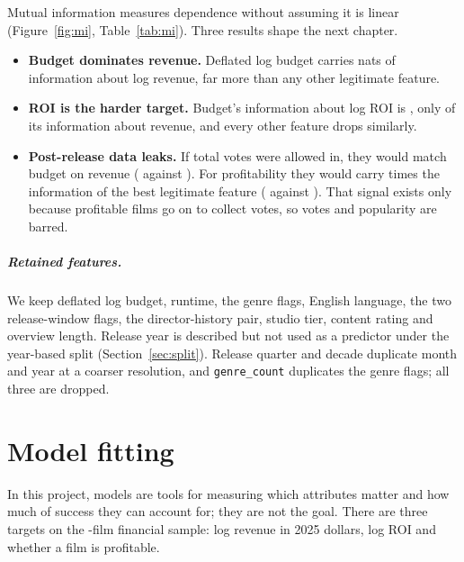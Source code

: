\documentclass[a4paper,12pt]{report}
\newcommand{\code}[1]{\texttt{#1}}
\begin{document}
Mutual information measures dependence without assuming it is linear (Figure~\ref{fig:mi}, Table~\ref{tab:mi}). Three results shape the next chapter.

\begin{itemize}
  \item \textbf{Budget dominates revenue.} Deflated log budget carries \FeatMiBudgetRevenue{} nats of information about log revenue, far more than any other legitimate feature.
  \item \textbf{ROI is the harder target.} Budget's information about log ROI is \FeatMiBudgetRoi, only \FeatMiRoiToRevenueRatioBudget{} of its information about revenue, and every other feature drops similarly.
  \item \textbf{Post-release data leaks.} If total votes were allowed in, they would match budget on revenue (\FeatMiVotesRevenueLeaky{} against \FeatMiBudgetRevenue). For profitability they would carry \FeatMiLeakRatioProfitable{} times the information of the best legitimate feature (\FeatMiVotesProfitableLeaky{} against \FeatMiBestLegitProfitable). That signal exists only because profitable films go on to collect votes, so votes and popularity are barred.
\end{itemize}

\paragraph{Retained features.} We keep deflated log budget, runtime, the genre flags, English language, the two release-window flags, the director-history pair, studio tier, content rating and overview length. Release year is described but not used as a predictor under the year-based split (Section~\ref{sec:split}). Release quarter and decade duplicate month and year at a coarser resolution, and \code{genre\_count} duplicates the genre flags; all three are dropped.

\chapter{Model fitting}\label{ch:models}

In this project, models are tools for measuring which attributes matter and how much of success they can account for; they are not the goal. There are three targets on the \ModelNModel-film financial sample: log revenue in 2025 dollars, log ROI and whether a film is profitable.
\end{document}

